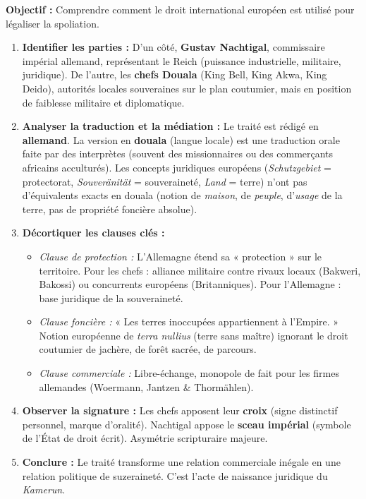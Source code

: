 \documentclass[11pt]{article}
\begin{document}
\begin{methode}
\textbf{Objectif :} Comprendre comment le droit international européen est utilisé pour légaliser la spoliation.
\begin{enumerate}
    \item \textbf{Identifier les parties :} D'un côté, \textbf{Gustav Nachtigal}, commissaire impérial allemand, représentant le Reich (puissance industrielle, militaire, juridique). De l'autre, les \textbf{chefs Douala} (King Bell, King Akwa, King Deido), autorités locales souveraines sur le plan coutumier, mais en position de faiblesse militaire et diplomatique.
    \item \textbf{Analyser la traduction et la médiation :} Le traité est rédigé en \textbf{allemand}. La version en \textbf{douala} (langue locale) est une traduction orale faite par des interprètes (souvent des missionnaires ou des commerçants africains acculturés). Les concepts juridiques européens (\emph{Schutzgebiet} = protectorat, \emph{Souveränität} = souveraineté, \emph{Land} = terre) n'ont pas d'équivalents exacts en douala (notion de \emph{maison}, de \emph{peuple}, d'\emph{usage} de la terre, pas de propriété foncière absolue).
    \item \textbf{Décortiquer les clauses clés :}
        \begin{itemize}
            \item \emph{Clause de protection :} L'Allemagne étend sa « protection » sur le territoire. Pour les chefs : alliance militaire contre rivaux locaux (Bakweri, Bakossi) ou concurrents européens (Britanniques). Pour l'Allemagne : base juridique de la souveraineté.
            \item \emph{Clause foncière :} « Les terres inoccupées appartiennent à l'Empire. » Notion européenne de \emph{terra nullius} (terre sans maître) ignorant le droit coutumier de jachère, de forêt sacrée, de parcours.
            \item \emph{Clause commerciale :} Libre-échange, monopole de fait pour les firmes allemandes (Woermann, Jantzen \& Thormählen).
        \end{itemize}
    \item \textbf{Observer la signature :} Les chefs apposent leur \textbf{croix} (signe distinctif personnel, marque d'oralité). Nachtigal appose le \textbf{sceau impérial} (symbole de l'État de droit écrit). Asymétrie scripturaire majeure.
    \item \textbf{Conclure :} Le traité transforme une relation commerciale inégale en une relation politique de suzeraineté. C'est l'acte de naissance juridique du \emph{Kamerun}.
\end{enumerate}
\end{methode}
\end{document}
